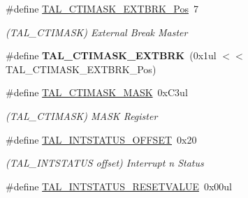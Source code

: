 \begin{DoxyCompactItemize}
\item 
\hypertarget{group___s_a_m_l21___t_a_l_gaac922364f93ac5adc725140b27efe9eb}{}\#define \hyperlink{group___s_a_m_l21___t_a_l_gaac922364f93ac5adc725140b27efe9eb}{T\+A\+L\+\_\+\+C\+T\+I\+M\+A\+S\+K\+\_\+\+E\+X\+T\+B\+R\+K\+\_\+\+Pos}~7\label{group___s_a_m_l21___t_a_l_gaac922364f93ac5adc725140b27efe9eb}

\begin{DoxyCompactList}\small\item\em (T\+A\+L\+\_\+\+C\+T\+I\+M\+A\+S\+K) External Break Master \end{DoxyCompactList}\item 
\hypertarget{group___s_a_m_l21___t_a_l_gaaa24bcddd831ed5eabbb75485528eb86}{}\#define {\bfseries T\+A\+L\+\_\+\+C\+T\+I\+M\+A\+S\+K\+\_\+\+E\+X\+T\+B\+R\+K}~(0x1ul $<$$<$ T\+A\+L\+\_\+\+C\+T\+I\+M\+A\+S\+K\+\_\+\+E\+X\+T\+B\+R\+K\+\_\+\+Pos)\label{group___s_a_m_l21___t_a_l_gaaa24bcddd831ed5eabbb75485528eb86}

\item 
\hypertarget{group___s_a_m_l21___t_a_l_ga10157bcea85d4e6e7b776d0f53cf4084}{}\#define \hyperlink{group___s_a_m_l21___t_a_l_ga10157bcea85d4e6e7b776d0f53cf4084}{T\+A\+L\+\_\+\+C\+T\+I\+M\+A\+S\+K\+\_\+\+M\+A\+S\+K}~0x\+C3ul\label{group___s_a_m_l21___t_a_l_ga10157bcea85d4e6e7b776d0f53cf4084}

\begin{DoxyCompactList}\small\item\em (T\+A\+L\+\_\+\+C\+T\+I\+M\+A\+S\+K) M\+A\+S\+K Register \end{DoxyCompactList}\item 
\hypertarget{group___s_a_m_l21___t_a_l_ga6ce2558d01e1c5699c11653d5e89779e}{}\#define \hyperlink{group___s_a_m_l21___t_a_l_ga6ce2558d01e1c5699c11653d5e89779e}{T\+A\+L\+\_\+\+I\+N\+T\+S\+T\+A\+T\+U\+S\+\_\+\+O\+F\+F\+S\+E\+T}~0x20\label{group___s_a_m_l21___t_a_l_ga6ce2558d01e1c5699c11653d5e89779e}

\begin{DoxyCompactList}\small\item\em (T\+A\+L\+\_\+\+I\+N\+T\+S\+T\+A\+T\+U\+S offset) Interrupt n Status \end{DoxyCompactList}\item 
\hypertarget{group___s_a_m_l21___t_a_l_gafefc882cfc049db5498446c1f4ef5675}{}\#define \hyperlink{group___s_a_m_l21___t_a_l_gafefc882cfc049db5498446c1f4ef5675}{T\+A\+L\+\_\+\+I\+N\+T\+S\+T\+A\+T\+U\+S\+\_\+\+R\+E\+S\+E\+T\+V\+A\+L\+U\+E}~0x00ul\label{group___s_a_m_l21___t_a_l_gafefc882cfc049db5498446c1f4ef5675}


\end{DoxyCompactItemize}
